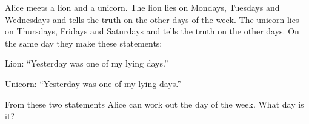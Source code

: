 Alice meets a lion and a unicorn. The lion lies on Mondays, Tuesdays and Wednesdays and tells the truth on the other days of the week. The unicorn lies on Thursdays, Fridays and Saturdays and tells the truth on the other days. On the same day they make these statements:

Lion: ``Yesterday was one of my lying days.''

Unicorn: ``Yesterday was one of my lying days.''

From these two statements Alice can work out the day of the week. What day is it?
